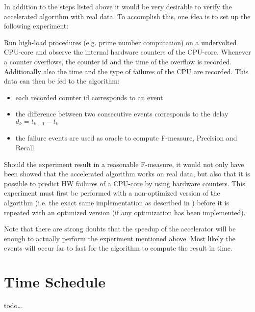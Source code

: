 \documentclass[12pt]{article} %
\begin{document}
In addition to the steps listed above it would be very desirable to verify the
accelerated algorithm with real data. To accomplish this, one idea is to set up
the following experiment:

Run high-load procedures (e.g. prime number computation) on a undervolted
CPU-core and observe the internal hardware counters of the CPU-core. Whenever
a counter overflows, the counter id and the time of the overflow is recorded.
Additionally also the time and the type of failures of the CPU are recorded.
This data can then be fed to the algorithm:
\begin{itemize}
    \item each recorded counter id corresponds to an event
    \item the difference between two consecutive events corresponds to the
        delay $ d_k = t_{k+1} - t_k $
    \item the failure events are used as oracle to compute F-measure, Precision
        and Recall
\end{itemize}
Should the experiment result in a reasonable F-measure, it would not only have
been showed that the accelerated algorithm works on real data, but also that it
is possible to predict HW failures of a CPU-core by using hardware counters.
This experiment must first be performed with a non-optimized version of the
algorithm (i.e. the exact same implementation as described in \cite{salfner08})
before it is repeated with an optimized version (if any optimization has been
implemented).

Note that there are strong doubts that the speedup of the accelerator will be
enough to actually perform the experiment mentioned above. Most likely the
events will occur far to fast for the algorithm to compute the result in time.


\section{Time Schedule} %
todo\dots


%



\end{document}
